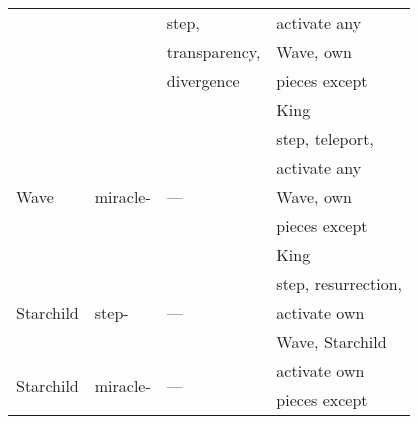 \begin{table}[!h]
\begin{tabular}{ llll }
                            &                           & step,                         & activate any              \\
                            &                           & transparency,                 & Wave, own                 \\
                            &                           & divergence                    & pieces except             \\
                            &                           &                               & King                      \\
\cmidrule{1-4} %
\multirow{5}{*}{Wave\footnotemark[4]}
                            & \multirow{5}{*}{miracle-} & \multirow{5}{*}{---}          & step, teleport,           \\
                            &                           &                               & activate any              \\
                            &                           &                               & Wave, own                 \\
                            &                           &                               & pieces except             \\
                            &                           &                               & King                      \\
\cmidrule{1-4} %
\multirow{3}{*}{Starchild}  & \multirow{3}{*}{step-}    & \multirow{3}{*}{---}          & step, resurrection,       \\
                            &                           &                               & activate own              \\
                            &                           &                               & Wave, Starchild           \\
\cmidrule{1-4} %
\multirow{5}{*}{Starchild}  & \multirow{5}{*}{miracle-} & \multirow{5}{*}{---}          & activate own              \\
                            &                           &                               & pieces except             \\

\end{tabular}
\end{table}
